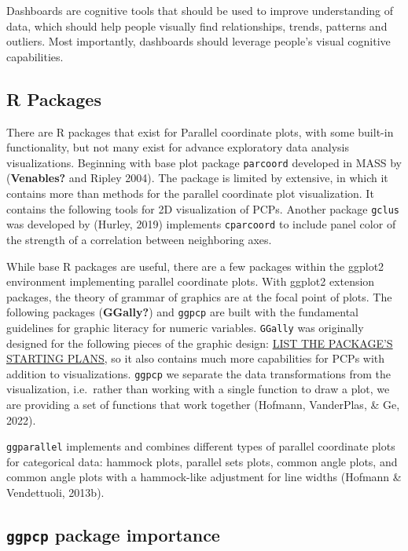 \documentclass[print]{nuthesis}
\begin{document}
Dashboards are cognitive tools that should be used to improve understanding of data, which should help people visually find relationships, trends, patterns and outliers. Most importantly, dashboards should leverage people's visual cognitive capabilities.

\hypertarget{r-packages}{%
\subsection{R Packages}\label{r-packages}}

There are R packages that exist for Parallel coordinate plots, with some built-in functionality, but not many exist for advance exploratory data analysis visualizations. Beginning with base plot package \texttt{parcoord} developed in MASS by (\textbf{Venables?} and Ripley 2004). The package is limited by extensive, in which it contains more than methods for the parallel coordinate plot visualization. It contains the following tools for 2D visualization of PCPs. Another package \texttt{gclus} was developed by (Hurley, 2019) implements \texttt{cparcoord} to include panel color of the strength of a correlation between neighboring axes.

While base R packages are useful, there are a few packages within the ggplot2 environment implementing parallel coordinate plots. With ggplot2 extension packages, the theory of grammar of graphics are at the focal point of plots. The following packages (\textbf{GGally?}) and \texttt{ggpcp} are built with the fundamental guidelines for graphic literacy for numeric variables. \texttt{GGally} was originally designed for the following pieces of the graphic design: \href{}{LIST THE PACKAGE'S STARTING PLANS}, so it also contains much more capabilities for PCPs with addition to visualizations. \texttt{ggpcp} we separate the data transformations from the visualization, i.e.~rather than working with a single function to draw a plot, we are providing a set of functions that work together (Hofmann, VanderPlas, \& Ge, 2022).

\texttt{ggparallel} implements and combines different types of parallel coordinate plots for categorical data: hammock plots, parallel sets plots, common angle plots, and common angle plots with a hammock-like adjustment for line widths (Hofmann \& Vendettuoli, 2013b).

\hypertarget{ggpcp-package-importance}{%
\subsection{\texorpdfstring{\texttt{ggpcp} package importance}{ggpcp package importance}}\label{ggpcp-package-importance}}
\end{document}
